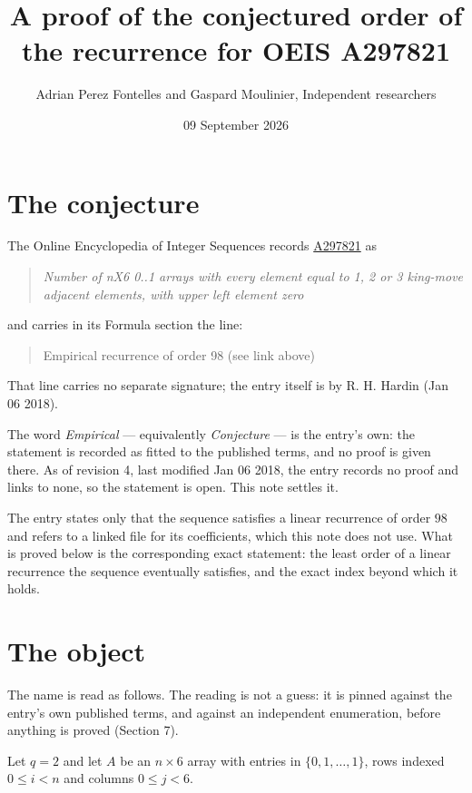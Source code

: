 \documentclass[11pt]{article}
\title{A proof of the conjectured order of the recurrence for OEIS A297821}
\author{Adrian Perez Fontelles and Gaspard Moulinier, Independent researchers}
\date{09 September 2026}
\theoremstyle{definition}
\begin{document}
\maketitle
\section{The conjecture}

The Online Encyclopedia of Integer Sequences records \href{https://oeis.org/A297821}{A297821} as

\begin{quote}\itshape Number of nX6 0..1 arrays with every element equal to 1, 2 or 3 king-move adjacent elements, with upper left element zero\end{quote}

and carries in its Formula section the line:

\begin{quote}\ttfamily Empirical recurrence of order 98 (see link above)\end{quote}

That line carries no separate signature; the entry itself is by R. H. Hardin (Jan 06 2018).

The word {\itshape Empirical} --- equivalently {\itshape Conjecture} --- is the entry's own: the statement is recorded as fitted to the published terms, and no proof is given there. As of revision 4, last modified Jan 06 2018, the entry records no proof and links to none, so the statement is open. This note settles it.

The entry states only that the sequence satisfies a linear recurrence of order $98$ and refers to a linked file for its coefficients, which this note does not use. What is proved below is the corresponding exact statement: the least order of a linear recurrence the sequence eventually satisfies, and the exact index beyond which it holds.

\section{The object}

The name is read as follows. The reading is not a guess: it is pinned against the entry's own published terms, and against an independent enumeration, before anything is proved (Section 7).

Let $q = 2$ and let $A$ be an $n \times 6$ array with entries in $\{0,1,\dots,1\}$, rows indexed $0 \le i < n$ and columns $0 \le j < 6$.
\end{document}
